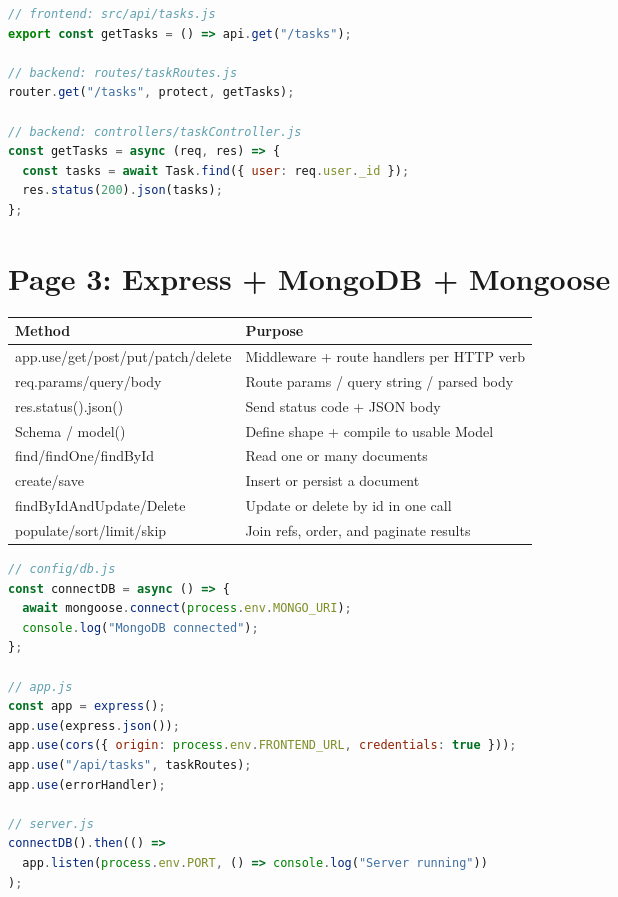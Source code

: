 \begin{lstlisting}[language=JavaScript]
// frontend: src/api/tasks.js
export const getTasks = () => api.get("/tasks");

// backend: routes/taskRoutes.js
router.get("/tasks", protect, getTasks);

// backend: controllers/taskController.js
const getTasks = async (req, res) => {
  const tasks = await Task.find({ user: req.user._id });
  res.status(200).json(tasks);
};
\end{lstlisting}

\newpage
\section*{Page 3: Express + MongoDB + Mongoose}

\begin{tabularx}{\textwidth}{@{}>{\ttfamily}p{4.3cm}X@{}}
\toprule
Method & Purpose \\
\midrule
app.use/get/post/put/patch/delete & Middleware + route handlers per HTTP
verb \\
req.params/query/body & Route params / query string / parsed body \\
res.status().json() & Send status code + JSON body \\
Schema / model() & Define shape + compile to usable Model \\
find/findOne/findById & Read one or many documents \\
create/save & Insert or persist a document \\
findByIdAndUpdate/Delete & Update or delete by id in one call \\
populate/sort/limit/skip & Join refs, order, and paginate results \\
\bottomrule
\end{tabularx}

\begin{lstlisting}[language=JavaScript]
// config/db.js
const connectDB = async () => {
  await mongoose.connect(process.env.MONGO_URI);
  console.log("MongoDB connected");
};

// app.js
const app = express();
app.use(express.json());
app.use(cors({ origin: process.env.FRONTEND_URL, credentials: true }));
app.use("/api/tasks", taskRoutes);
app.use(errorHandler);

// server.js
connectDB().then(() =>
  app.listen(process.env.PORT, () => console.log("Server running"))
);
\end{lstlisting}

